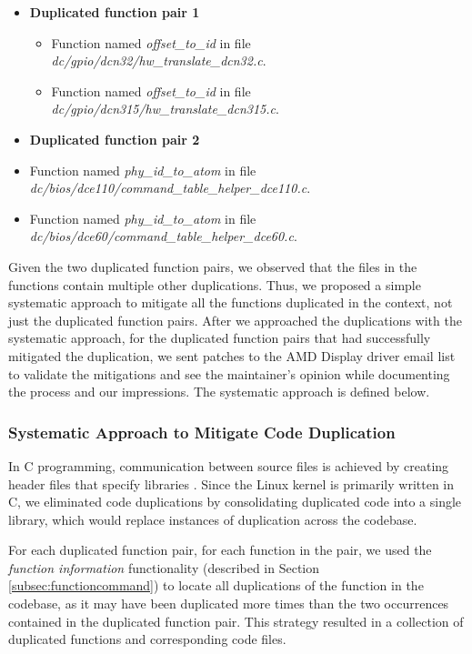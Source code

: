 \begin{itemize}
\item \textbf{Duplicated function pair 1}
\begin{itemize}
\item Function named \textit{offset\_to\_id} in file \textit{dc/gpio/dcn32/hw\_translate\_dcn32.c}.
\item Function named \textit{offset\_to\_id} in file \textit{dc/gpio/dcn315/hw\_translate\_dcn315.c}.
\end{itemize}
\item \textbf{Duplicated function pair 2}
\item Function named \textit{phy\_id\_to\_atom} in file \textit{dc/bios/dce110/command\_table\_helper\_dce110.c}.
\item Function named \textit{phy\_id\_to\_atom} in file \textit{dc/bios/dce60/command\_table\_helper\_dce60.c}.
\end{itemize}

Given the two duplicated function pairs, we observed that the files in the functions 
contain multiple other duplications. Thus, we proposed a simple systematic approach 
to mitigate all the functions duplicated in the context, not just the duplicated 
function pairs. 
After we approached the duplications with the systematic approach, for the duplicated 
function pairs that had successfully mitigated the duplication, we sent patches to the 
AMD Display driver email list to validate the mitigations and see the maintainer's opinion 
while documenting the process and our impressions.
The systematic approach is defined below.

\subsubsection{Systematic Approach to Mitigate Code Duplication}
\label{subsubsec:systematic}

In C programming, communication between source files is achieved by creating header files that specify 
libraries \citep{Cbook}. Since the Linux kernel is primarily written in C, we eliminated code duplications 
by consolidating duplicated code into a single library, which would replace instances of 
duplication across the codebase.

For each duplicated function pair, for each function in the pair, we used the \textit{function information} functionality 
(described in Section \ref{subsec:functioncommand}) to locate all duplications of the function in the codebase, 
as it may have been duplicated more times than the two occurrences contained in the duplicated function pair. 
This strategy resulted in a collection of duplicated functions and corresponding code files.

